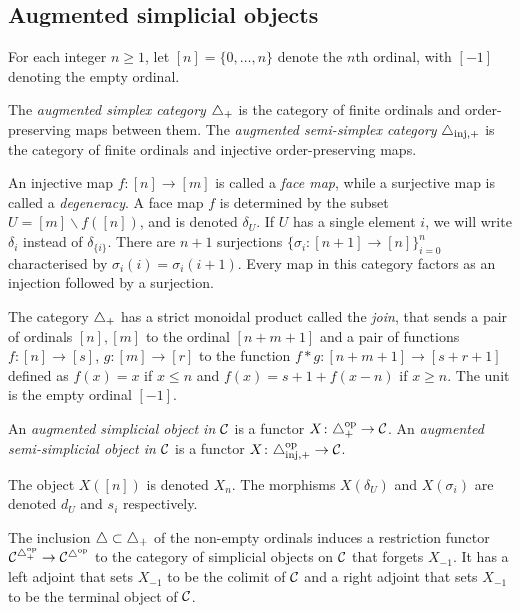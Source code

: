 \subsection{Augmented simplicial objects}

For each integer $n\geq 1$, let $[n] = \{0,\ldots,n\}$ denote the $n$th ordinal, with $[-1]$ denoting the empty ordinal.

\begin{definition}
	The \emph{augmented simplex category} $\triangle_{+}$ is the category of finite ordinals and order-preserving maps between them. The \emph{augmented semi-simplex category} $\triangle_{\mathrm{inj},+}$ is the category of finite ordinals and injective order-preserving maps.
\end{definition}

An injective map $f\colon [n]\to [m]$ is called a \emph{face map}, while a surjective map is called a \emph{degeneracy}. A face map $f$ is determined by the subset $U = [m]\smallsetminus f([n])$, and is denoted $\delta_U$. If $U$ has a single element $i$, we will write $\delta_i$ instead of $\delta_{\{i\}}$. There are $n+1$ surjections $\{\sigma_i\colon [n+1]\to [n]\}_{i=0}^n$ characterised by $\sigma_i(i) = \sigma_i(i+1)$. Every map in this category factors as an injection followed by a surjection.

The category $\triangle_+$ has a strict monoidal product called the \emph{join}, that sends a pair of ordinals $[n],[m]$ to the ordinal $[n+m+1]$ and a pair of functions $f\colon [n]\to [s]$, $g\colon [m]\to [r]$ to the function $f*g\colon [n+m+1]\to [s+r+1]$ defined as $f(x) = x$ if $x\leq  n$ and $f(x) = s+1+f(x-n)$ if $x\geq n$. The unit is the empty ordinal $[-1]$.

\begin{definition}
	An \emph{augmented simplicial object in $\mathcal{C}$} is a functor $X\colon \triangle_{+}^\mathrm{op}\to \mathcal{C}$. An \emph{augmented semi-simplicial object in $\mathcal{C}$} is a functor $X\colon \triangle_{\mathrm{inj},+}^\mathrm{op}\to \mathcal{C}$.
\end{definition}

The object $X([n])$ is denoted $X_n$. The morphisms $X(\delta_U)$ and $X(\sigma_i)$ are denoted $d_U$ and $s_i$ respectively.

The inclusion $\triangle\subset \triangle_{+}$ of the non-empty ordinals induces a restriction functor $\mathcal{C}^{\triangle_{+}^{{\mathrm{op}}}}\to \mathcal{C}^{\triangle^{{\mathrm{op}}}}$ to the category of simplicial objects on $\mathcal{C}$ that forgets $X_{-1}$. It has a left adjoint that sets $X_{-1}$ to be the colimit of $\mathcal{C}$ and a right adjoint that sets $X_{-1}$ to be the terminal object of $\mathcal{C}$.

